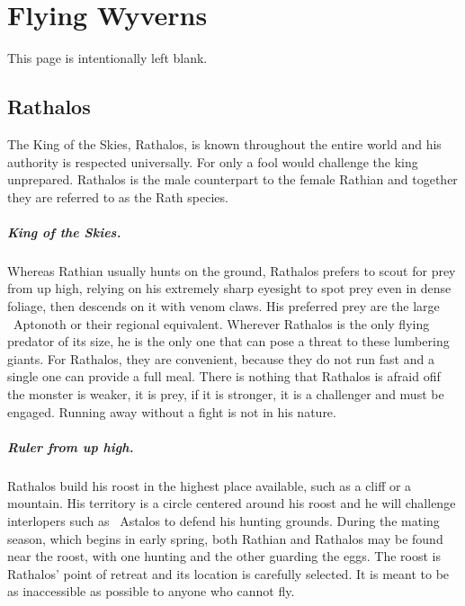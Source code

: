\newcommand{\chapterx}[1]{%
\chapter*{#1}%
\addcontentsline{toc}{chapter}{#1}}

\chapterx{Flying Wyverns}
This page is intentionally left blank.
\clearpage

\section*{Rathalos}
The King of the Skies, Rathalos, is known throughout the entire world and his authority is respected universally. For only a fool would challenge the king unprepared. Rathalos is the male counterpart to the female Rathian and together they are referred to as the Rath species.

\paragraph*{King of the Skies.} Whereas Rathian usually hunts on the ground, Rathalos prefers to scout for prey from up high, relying on his extremely sharp eyesight to spot prey even in dense foliage, then descends on it with venom claws. His preferred prey are the large ~Aptonoth or their regional equivalent. Wherever Rathalos is the only flying predator of its size, he is the only one that can pose a threat to these lumbering giants. For Rathalos, they are convenient, because they do not run fast and a single one can provide a full meal. There is nothing that Rathalos is afraid of\hbNone if the monster is weaker, it is prey, if it is stronger, it is a challenger and must be engaged. Running away without a fight is not in his nature.

\paragraph*{Ruler from up high.} Rathalos build his roost in the highest place available, such as a cliff or a mountain. His territory is a circle centered around his roost and he will challenge interlopers such as ~Astalos to defend his hunting grounds. During the mating season, which begins in early spring, both Rathian and Rathalos may be found near the roost, with one hunting and the other guarding the eggs. The roost is Rathalos' point of retreat and its location is carefully selected. It is meant to be as inaccessible as possible to anyone who cannot fly.

